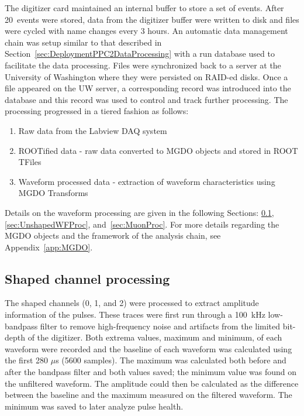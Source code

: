 	The digitizer card maintained an internal buffer to store a set of events.  After 20~events were stored, data from the digitizer buffer were written to disk and files were cycled with name changes every 3 hours.  An automatic data management chain was setup similar to that described in Section~\ref{sec:DeploymentPPC2DataProcessing} with a run database used to facilitate the data processing.  Files were synchronized back to a server at the University of Washington where they were persisted on RAID-ed disks.  Once a file appeared on the UW server, a corresponding record was introduced into the database and this record was used to control and track further processing.  The processing progressed in a tiered fashion as follows:
		\begin{enumerate}
			\item[Tier 0:]  Raw data from the Labview DAQ system
			\item[Tier 1:]  ROOTified data - raw data converted to MGDO objects and stored in ROOT TFiles
			\item[Tier 2:]  Waveform processed data - extraction of waveform characteristics using MGDO Transforms
		\end{enumerate}
Details on the waveform processing are given in the following Sections: \ref{sec:BegeShapedProc}, \ref{sec:UnshapedWFProc}, and~\ref{sec:MuonProc}.  For more details regarding the MGDO objects and the framework of the analysis chain, see Appendix~\ref{app:MGDO}.
	
		\subsection{Shaped channel processing}
		\label{sec:BegeShapedProc}

The shaped channels (0, 1, and 2) were processed to extract amplitude information of the pulses.  These traces were first run through a 100~kHz low-bandpass filter to remove high-frequency noise and artifacts from the limited bit-depth of the digitizer.  Both extrema values, maximum and minimum, of each waveform were recorded and the baseline of each waveform was calculated using the first 280 $\mu$s (5600 samples).  The maximum was calculated both before and after the bandpass filter and both values saved; the minimum value was found on the unfiltered waveform.  The amplitude could then be calculated as the difference between the baseline and the maximum measured on the filtered waveform.  The minimum was saved to later analyze pulse health.

